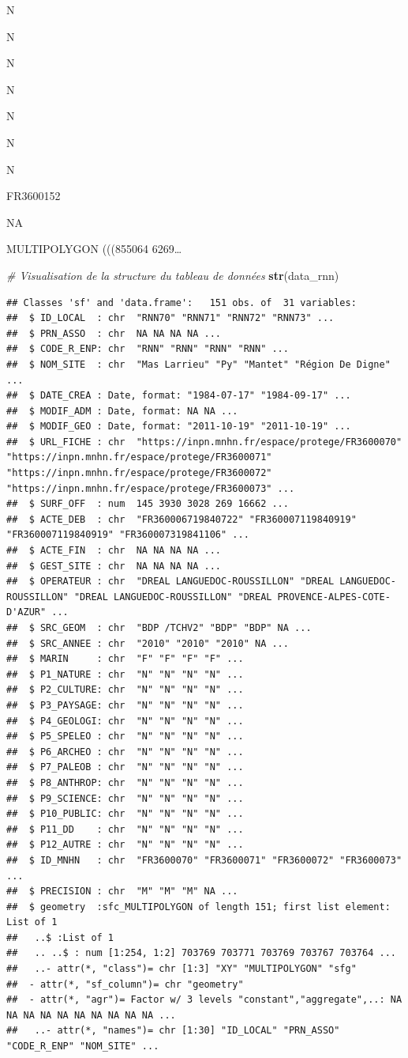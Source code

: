 \documentclass[
  french,
]{book}
\newenvironment{Shaded}{\begin{snugshade}}{\end{snugshade}}
\newcommand{\CommentTok}[1]{\textcolor[rgb]{0.56,0.35,0.01}{\textit{#1}}}
\newcommand{\KeywordTok}[1]{\textcolor[rgb]{0.13,0.29,0.53}{\textbf{#1}}}
\newcommand{\NormalTok}[1]{#1}
\begin{document}
N

N

N

N

N

N

N

FR3600152

NA

MULTIPOLYGON (((855064 6269\ldots{}

\begin{Shaded}
\begin{Highlighting}[]
\CommentTok{\# Visualisation de la structure du tableau de données}
\KeywordTok{str}\NormalTok{(data\_rnn)}
\end{Highlighting}
\end{Shaded}

\begin{verbatim}
## Classes 'sf' and 'data.frame':	151 obs. of  31 variables:
##  $ ID_LOCAL  : chr  "RNN70" "RNN71" "RNN72" "RNN73" ...
##  $ PRN_ASSO  : chr  NA NA NA NA ...
##  $ CODE_R_ENP: chr  "RNN" "RNN" "RNN" "RNN" ...
##  $ NOM_SITE  : chr  "Mas Larrieu" "Py" "Mantet" "Région De Digne" ...
##  $ DATE_CREA : Date, format: "1984-07-17" "1984-09-17" ...
##  $ MODIF_ADM : Date, format: NA NA ...
##  $ MODIF_GEO : Date, format: "2011-10-19" "2011-10-19" ...
##  $ URL_FICHE : chr  "https://inpn.mnhn.fr/espace/protege/FR3600070" "https://inpn.mnhn.fr/espace/protege/FR3600071" "https://inpn.mnhn.fr/espace/protege/FR3600072" "https://inpn.mnhn.fr/espace/protege/FR3600073" ...
##  $ SURF_OFF  : num  145 3930 3028 269 16662 ...
##  $ ACTE_DEB  : chr  "FR360006719840722" "FR360007119840919" "FR360007119840919" "FR360007319841106" ...
##  $ ACTE_FIN  : chr  NA NA NA NA ...
##  $ GEST_SITE : chr  NA NA NA NA ...
##  $ OPERATEUR : chr  "DREAL LANGUEDOC-ROUSSILLON" "DREAL LANGUEDOC-ROUSSILLON" "DREAL LANGUEDOC-ROUSSILLON" "DREAL PROVENCE-ALPES-COTE-D'AZUR" ...
##  $ SRC_GEOM  : chr  "BDP /TCHV2" "BDP" "BDP" NA ...
##  $ SRC_ANNEE : chr  "2010" "2010" "2010" NA ...
##  $ MARIN     : chr  "F" "F" "F" "F" ...
##  $ P1_NATURE : chr  "N" "N" "N" "N" ...
##  $ P2_CULTURE: chr  "N" "N" "N" "N" ...
##  $ P3_PAYSAGE: chr  "N" "N" "N" "N" ...
##  $ P4_GEOLOGI: chr  "N" "N" "N" "N" ...
##  $ P5_SPELEO : chr  "N" "N" "N" "N" ...
##  $ P6_ARCHEO : chr  "N" "N" "N" "N" ...
##  $ P7_PALEOB : chr  "N" "N" "N" "N" ...
##  $ P8_ANTHROP: chr  "N" "N" "N" "N" ...
##  $ P9_SCIENCE: chr  "N" "N" "N" "N" ...
##  $ P10_PUBLIC: chr  "N" "N" "N" "N" ...
##  $ P11_DD    : chr  "N" "N" "N" "N" ...
##  $ P12_AUTRE : chr  "N" "N" "N" "N" ...
##  $ ID_MNHN   : chr  "FR3600070" "FR3600071" "FR3600072" "FR3600073" ...
##  $ PRECISION : chr  "M" "M" "M" NA ...
##  $ geometry  :sfc_MULTIPOLYGON of length 151; first list element: List of 1
##   ..$ :List of 1
##   .. ..$ : num [1:254, 1:2] 703769 703771 703769 703767 703764 ...
##   ..- attr(*, "class")= chr [1:3] "XY" "MULTIPOLYGON" "sfg"
##  - attr(*, "sf_column")= chr "geometry"
##  - attr(*, "agr")= Factor w/ 3 levels "constant","aggregate",..: NA NA NA NA NA NA NA NA NA NA ...
##   ..- attr(*, "names")= chr [1:30] "ID_LOCAL" "PRN_ASSO" "CODE_R_ENP" "NOM_SITE" ...
\end{verbatim}
\end{document}
